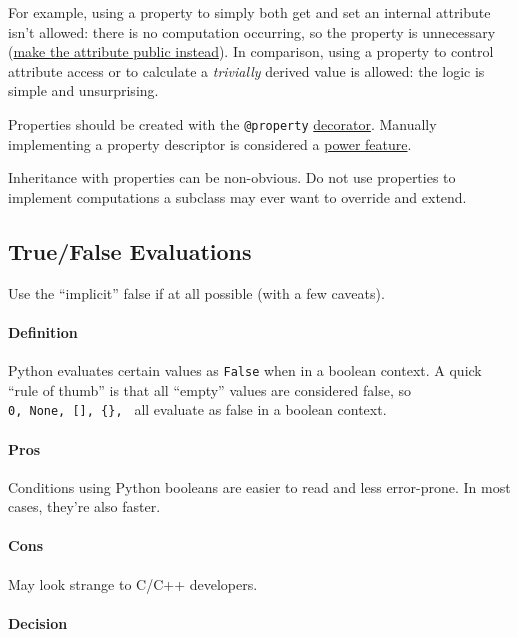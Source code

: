 \documentclass[
]{article}
\begin{document}
For example, using a property to simply both get and set an internal
attribute isn't allowed: there is no computation occurring, so the
property is unnecessary (\hyperref[getters-and-setters]{make the
attribute public instead}). In comparison, using a property to control
attribute access or to calculate a \emph{trivially} derived value is
allowed: the logic is simple and unsurprising.

Properties should be created with the \texttt{@property}
\hyperref[s2.17-function-and-method-decorators]{decorator}. Manually
implementing a property descriptor is considered a
\hyperref[power-features]{power feature}.

Inheritance with properties can be non-obvious. Do not use properties to
implement computations a subclass may ever want to override and extend.

\subsection{True/False Evaluations}

Use the ``implicit'' false if at all possible (with a few caveats).

\paragraph{Definition}

Python evaluates certain values as \texttt{False} when in a boolean
context. A quick ``rule of thumb'' is that all ``empty'' values are
considered false, so
\texttt{0,\ None,\ {[}{]},\ \{\},\ \textquotesingle{}\textquotesingle{}}
all evaluate as false in a boolean context.

\paragraph{Pros}

Conditions using Python booleans are easier to read and less
error-prone. In most cases, they're also faster.

\paragraph{Cons}

May look strange to C/C++ developers.

\paragraph{Decision}
\end{document}
